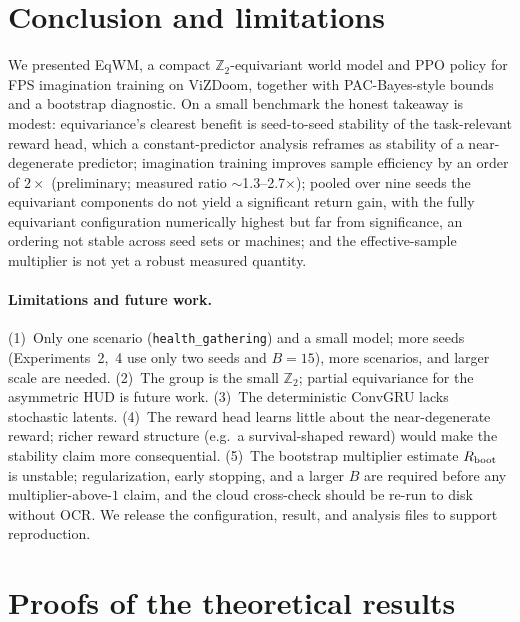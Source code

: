 \documentclass[preprint,12pt]{elsarticle}
\begin{document}
\section{Conclusion and limitations}\label{sec:concl}
We presented EqWM, a compact $\mathbb Z_2$-equivariant world model and PPO
policy for FPS imagination training on ViZDoom, together with PAC-Bayes-style
bounds and a bootstrap diagnostic. On a small benchmark the honest takeaway
is modest: equivariance's clearest benefit is seed-to-seed stability of the
task-relevant reward head, which a constant-predictor analysis reframes as
stability of a near-degenerate predictor; imagination training improves
sample efficiency by an order of $2\times$ (preliminary; measured ratio
$\sim$1.3--2.7$\times$); pooled over nine seeds the equivariant components do
not yield a significant return gain, with the fully equivariant configuration
numerically highest but far from significance, an ordering not stable across
seed sets or machines; and the effective-sample
multiplier is not yet a robust measured quantity.

\paragraph{Limitations and future work.}
(1)~Only one scenario (\texttt{health\_gathering}) and a small model; more
seeds (Experiments~2,~4 use only two seeds and $B=15$), more scenarios, and
larger scale are needed. (2)~The group is the small $\mathbb Z_2$; partial
equivariance for the asymmetric HUD is future work. (3)~The deterministic
ConvGRU lacks stochastic latents. (4)~The reward head learns little about the
near-degenerate reward; richer reward structure (e.g.\ a survival-shaped
reward) would make the stability claim more consequential. (5)~The bootstrap
multiplier estimate $R_{\rm boot}$ is unstable; regularization, early
stopping, and a larger $B$ are required before any multiplier-above-$1$
claim, and the cloud cross-check should be re-run to disk without OCR. We
release the configuration, result, and analysis files to support reproduction.

\appendix
\section{Proofs of the theoretical results}\label{app:proofs}
\end{document}
